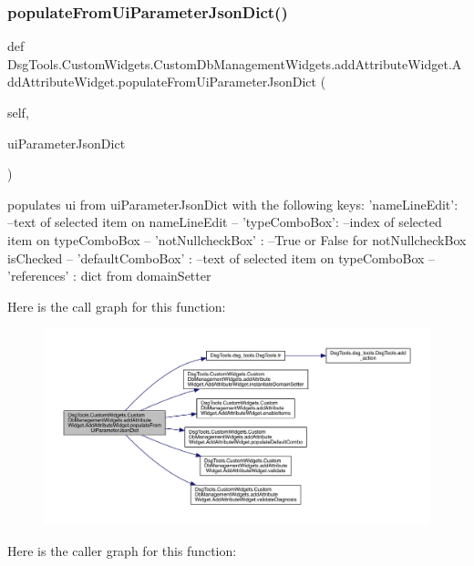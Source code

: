 \subsubsection{\texorpdfstring{populate\+From\+Ui\+Parameter\+Json\+Dict()}{populateFromUiParameterJsonDict()}}
{\footnotesize\ttfamily def Dsg\+Tools.\+Custom\+Widgets.\+Custom\+Db\+Management\+Widgets.\+add\+Attribute\+Widget.\+Add\+Attribute\+Widget.\+populate\+From\+Ui\+Parameter\+Json\+Dict (\begin{DoxyParamCaption}\item[{}]{self,  }\item[{}]{ui\+Parameter\+Json\+Dict }\end{DoxyParamCaption})}

\begin{DoxyVerb}populates ui from  uiParameterJsonDict with the following keys:
{
    'nameLineEdit': --text of selected item on nameLineEdit --
    'typeComboBox': --index of selected item on typeComboBox --
    'notNullcheckBox' : --True or False for notNullcheckBox isChecked --
    'defaultComboBox' : --text of selected item on typeComboBox --
    'references' : dict from domainSetter
}
\end{DoxyVerb}
 Here is the call graph for this function\+:
\nopagebreak
\begin{figure}[H]
\begin{center}
\leavevmode
\includegraphics[width=350pt]{class_dsg_tools_1_1_custom_widgets_1_1_custom_db_management_widgets_1_1add_attribute_widget_1_1_add_attribute_widget_a878e493b127050a4241892d85d437e9e_cgraph}
\end{center}
\end{figure}
Here is the caller graph for this function\+:
\nopagebreak
